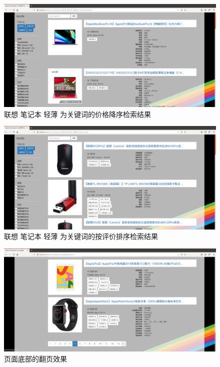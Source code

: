 \begin{figure}[htbp]
\centering
\includegraphics[width=13.5cm]{img/zlt/decreasing_price.png}
\caption{联想 笔记本 轻薄 为关键词的价格降序检索结果}
\label{fig:zlt_decreasing_price}
\end{figure}

\begin{figure}[htbp]
\centering
\includegraphics[width=13.5cm]{img/zlt/high_rank.png}
\caption{联想 笔记本 轻薄 为关键词的按评价排序检索结果}
\label{fig:zlt_high_rank}
\end{figure}

\begin{figure}[htbp]
\centering
\includegraphics[width=13.5cm]{img/zlt/leafflip.png}
\caption{页面底部的翻页效果}
\label{fig:zlt_leaf_flip}
\end{figure}


